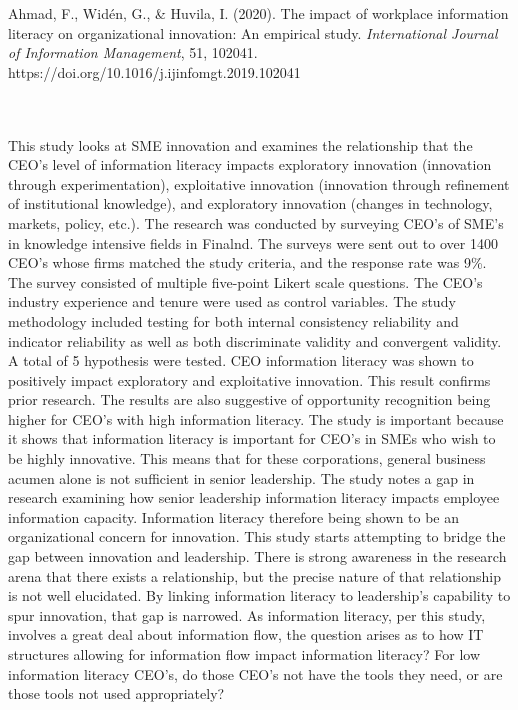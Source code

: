 \documentclass{apa7}
\begin{document}
\bigskip
\hfill\begin{minipage}{\dimexpr\textwidth-1in}
\begin{hangparas}{.25in}{1}
Ahmad, F., Widén, G., \& Huvila, I. (2020). The impact of workplace information literacy on organizational innovation: An empirical study. \textit{International Journal of Information Management}, 51, 102041. https://doi.org/10.1016/j.ijinfomgt.2019.102041
\end{hangparas}
\xdef\tpd{\the\prevdepth}
\end{minipage}
\\
\\
This study looks at SME innovation and examines the relationship that the CEO's level of information literacy impacts exploratory innovation (innovation through experimentation), exploitative innovation (innovation through refinement of institutional knowledge), and exploratory innovation (changes in technology, markets, policy, etc.). The research was conducted by surveying CEO's of SME's in knowledge intensive fields in Finalnd. The surveys were sent out to over 1400 CEO's whose firms matched the study criteria, and the response rate was 9\%. The survey consisted of multiple five-point Likert scale questions. The CEO's industry experience and tenure were used as control variables. The study methodology included testing for both internal consistency reliability and indicator reliability as well as both discriminate validity and convergent validity. A total of 5 hypothesis were tested. CEO information literacy was shown to positively impact exploratory and exploitative innovation. This result confirms prior research. The results are also suggestive of opportunity recognition being higher for CEO's with high information literacy. The study is important because it shows that information literacy is important for CEO's in SMEs who wish to be highly innovative. This means that for these corporations, general business acumen alone is not sufficient in senior leadership. The study notes a gap in research examining how senior leadership information literacy impacts employee information capacity. Information literacy therefore being shown to be an organizational concern for innovation. This study starts attempting to bridge the gap between innovation and leadership. There is strong awareness in the research arena that there exists a relationship, but the precise nature of that relationship is not well elucidated. By linking information literacy to leadership's capability to spur innovation, that gap is narrowed. As information literacy, per this study, involves a great deal about information flow, the question arises as to how IT structures allowing for information flow impact information literacy? For low information literacy CEO's, do those CEO's not have the tools they need, or are those tools not used appropriately?
\end{document}
